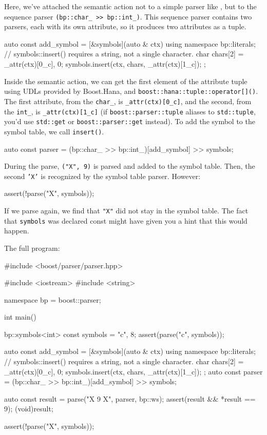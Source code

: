Here, we've attached the semantic action not to a simple parser like , but to the sequence parser \texttt{(bp::char\_ >> bp::int\_)}. This sequence parser contains two parsers, each with its own attribute, so it produces two attributes as a tuple.

\begin{code}
auto const add_symbol = [&symbols](auto & ctx) {
    using namespace bp::literals;
    // symbols::insert() requires a string, not a single character.
    char chars[2] = {_attr(ctx)[0_c], 0};
    symbols.insert(ctx, chars, _attr(ctx)[1_c]);
};
\end{code}

Inside the semantic action, we can get the first element of the attribute tuple using UDLs provided by Boost.Hana, and \texttt{boost::hana::tuple::operator{[}{]}()}. The first attribute, from the \texttt{char\_}, is \texttt{\_attr(ctx){[}0\_c{]}}, and the second, from the \texttt{int\_}, is \texttt{\_attr(ctx){[}1\_c{]}} (if \texttt{boost::parser::tuple} aliases to \texttt{std::tuple}, you'd use \texttt{std::get} or \texttt{boost::parser::get} instead). To add the symbol to the symbol table, we call \texttt{insert()}.

\begin{code}
auto const parser = (bp::char_ >> bp::int_)[add_symbol] >> symbols;
\end{code}

During the parse, \texttt{("X", 9)} is parsed and added to the symbol table. Then, the second \texttt{'X'} is recognized by the symbol table parser. However:

\begin{code}
assert(!parse("X", symbols));
\end{code}

If we parse again, we find that \texttt{"X"} did not stay in the symbol table. The fact that \texttt{symbols} was declared const might have given you a hint that this would happen.

The full program:

\begin{code}
#include <boost/parser/parser.hpp>

#include <iostream>
#include <string>


namespace bp = boost::parser;

int main()
{
    bp::symbols<int> const symbols = {{"c", 8}};
    assert(parse("c", symbols));

    auto const add_symbol = [&symbols](auto & ctx) {
        using namespace bp::literals;
        // symbols::insert() requires a string, not a single character.
        char chars[2] = {_attr(ctx)[0_c], 0};
        symbols.insert(ctx, chars, _attr(ctx)[1_c]);
    };
    auto const parser = (bp::char_ >> bp::int_)[add_symbol] >> symbols;

    auto const result = parse("X 9 X", parser, bp::ws);
    assert(result && *result == 9);
    (void)result;

    assert(!parse("X", symbols));
}
\end{code}


